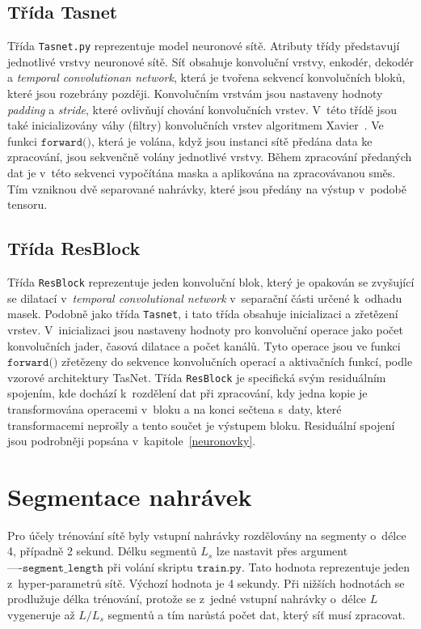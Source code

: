 \subsection*{Třída Tasnet}
Třída \texttt{Tasnet.py} reprezentuje model neuronové sítě. Atributy třídy představují jednotlivé vrstvy neuronové sítě. Síť obsahuje konvoluční vrstvy, enkodér, dekodér a \textit{temporal convolutionan network}, která je tvořena sekvencí konvolučních bloků, které jsou rozebrány později. Konvolučním vrstvám jsou nastaveny hodnoty \textit{padding} a \textit{stride}, které ovlivňují chování konvolučních vrstev. V~této třídě jsou také inicializovány váhy (filtry) konvolučních vrstev algoritmem Xavier~\cite{pmlr-v9-glorot10a}. Ve funkci $\texttt{forward()}$, která je volána, když jsou instanci sítě předána data ke zpracování, jsou sekvenčně volány jednotlivé vrstvy. Během zpracování předaných dat je v~této sekvenci vypočítána maska a aplikována na zpracovávanou směs. Tím vzniknou dvě separované nahrávky, které jsou předány na výstup v~podobě tensoru. 


\subsection*{Třída ResBlock}
Třída \texttt{ResBlock} reprezentuje jeden konvoluční blok, který je opakován se zvyšující se dilatací v~\textit{temporal convolutional network} v~separační části určené k~odhadu masek. Podobně jako třída \texttt{Tasnet}, i tato třída obsahuje inicializaci a zřetězení vrstev. V~inicializaci jsou nastaveny hodnoty pro konvoluční operace jako počet konvolučních jader, časová dilatace a počet kanálů. Tyto operace jsou ve funkci $\texttt{forward()}$ zřetězeny do sekvence konvolučních operací a aktivačních funkcí, podle vzorové architektury TasNet. Třída \texttt{ResBlock} je specifická svým residuálním spojením, kde dochází k~rozdělení dat při zpracování, kdy jedna kopie je transformována operacemi v~bloku a na konci sečtena s~daty, které transformacemi neprošly a tento součet je výstupem bloku. Residuální spojení jsou podrobněji popsána v~kapitole~\ref{neuronovky}.


\section{Segmentace nahrávek}
\label{sec:segmentace}
Pro účely trénování sítě byly vstupní nahrávky rozdělovány na segmenty o~délce 4, případně 2 sekund. Délku segmentů $L_s$ lze nastavit přes argument $\texttt{----segment\_length}$ při volání skriptu $\texttt{train.py}$. Tato hodnota reprezentuje jeden z~hyper-parametrů sítě. Výchozí hodnota je 4 sekundy. Při nižších hodnotách se prodlužuje délka trénování, protože se z~jedné vstupní nahrávky o~délce $L$ vygeneruje až $L/L_s$  segmentů a tím narůstá počet dat, který síť musí zpracovat. 


